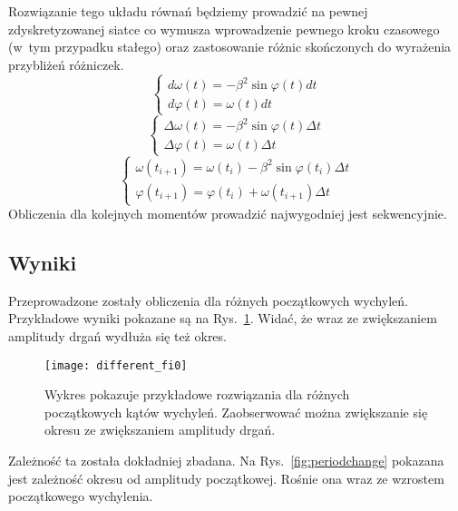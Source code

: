 \documentclass[a4paper; 12pt]{article}
\begin{document}
Rozwiązanie tego układu równań będziemy prowadzić na pewnej zdyskretyzowanej
siatce co wymusza wprowadzenie pewnego kroku czasowego (w~tym przypadku
stałego) oraz zastosowanie różnic skończonych do wyrażenia przybliżeń różniczek.
\begin{equation}
    \begin{cases}
        d\omega(t) = - \beta^2 \sin{\varphi(t)} dt \\
        d\varphi(t) = \omega(t) dt
    \end{cases}
\end{equation}
\begin{equation}
    \begin{cases}
        \Delta\omega(t) = - \beta^2 \sin{\varphi(t)} \Delta t \\
        \Delta\varphi(t) = \omega(t) \Delta t
    \end{cases}
\end{equation}
\begin{equation}
    \begin{cases}
        \omega(t_{i+1}) = \omega(t_{i}) - \beta^2 \sin{\varphi(t_i)} \Delta t \\
        \varphi(t_{i+1}) = \varphi(t_i) + \omega(t_{i+1}) \Delta t
    \end{cases}
\end{equation}
Obliczenia dla kolejnych momentów prowadzić najwygodniej jest sekwencyjnie.

\subsection{Wyniki}

Przeprowadzone zostały obliczenia dla różnych początkowych wychyleń.
Przykładowe wyniki pokazane są na Rys.~\ref{fig:differentfi0}.
Widać, że wraz ze zwiększaniem amplitudy drgań wydłuża się też okres.

\begin{figure}[h]
    \centering
    \texttt{[image: different\_fi0]}
    \caption{Wykres pokazuje przykładowe rozwiązania dla różnych początkowych
        kątów wychyleń.
        Zaobserwować można zwiększanie się okresu ze zwiększaniem amplitudy drgań.}
    \label{fig:differentfi0}
\end{figure}

Zależność ta została dokładniej zbadana.
Na Rys.~\ref{fig:periodchange} pokazana jest zależność okresu od amplitudy
początkowej.
Rośnie ona wraz ze wzrostem początkowego wychylenia.
\end{document}
